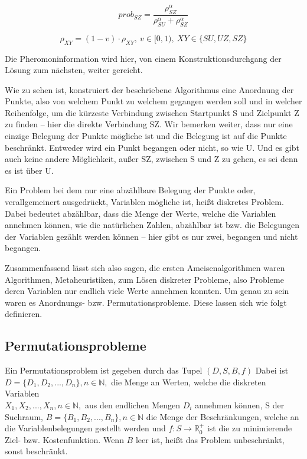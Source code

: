 \documentclass[fontsize=12, a4aper]{scrartcl}
\begin{document}
	\begin{equation} \label{direkterWeg}
	prob_{SZ} = \frac{\rho_{SZ}^\alpha}{\rho_{SU}^\alpha+\rho_{SZ}^\alpha}
	\end{equation}
	
	\begin{equation} \label{Verdustung}
	\rho_{XY} = (1-v)\cdot\rho_{XY}, ~ v \in [0,1), ~ XY \in \{SU, UZ, SZ\}
	\end{equation}
	
	Die Pheromoninformation wird hier, von einem Konstruktionsdurchgang der Lösung zum nächsten, weiter gereicht.\hfill\newline
	
	Wie zu sehen ist, konstruiert der beschriebene Algorithmus eine Anordnung der Punkte, also von welchem Punkt zu welchem gegangen werden soll und in welcher Reihenfolge, um die kürzeste Verbindung zwischen Startpunkt S und Zielpunkt Z zu finden -- hier die direkte Verbindung SZ. Wir bemerken weiter, dass nur eine einzige Belegung der Punkte mögliche ist und die Belegung ist auf die Punkte beschränkt. Entweder wird ein Punkt begangen oder nicht, so wie U. Und es gibt auch keine andere Möglichkeit, außer SZ, zwischen S und Z zu gehen, es sei denn es ist über U.\hfill\newline
	
	Ein Problem bei dem nur eine abzählbare Belegung der Punkte oder, verallgemeinert ausgedrückt, Variablen mögliche ist, heißt diskretes Problem. Dabei bedeutet abzählbar, dass die Menge der Werte, welche die Variablen annehmen können, wie die natürlichen Zahlen, abzählbar ist bzw. die Belegungen der Variablen gezählt werden können -- hier gibt es nur zwei, begangen und nicht begangen. \hfill\newline
	
	Zusammenfassend lässt sich also sagen, die ersten Ameisenalgorithmen waren Algorithmen, Metaheuristiken, zum Lösen diskreter Probleme, also Probleme deren Variablen nur endlich viele Werte annehmen konnten. Um genau zu sein waren es Anordnungs- bzw. Permutationsprobleme. Diese lassen sich wie folgt definieren.\hfill\newline
	
	\subsection{Permutationsprobleme}
	
	Ein Permutationsproblem ist gegeben durch das Tupel \((D, S, B, f)\) Dabei ist \(D=\{D_1, D_2, ..., D_n\}, n \in \mathbb{N},\) die Menge an Werten, welche die diskreten Variablen\\
	\(X_1, X_2, ..., X_n, n \in \mathbb{N},\) aus den endlichen Mengen \(D_i\) annehmen können, S der Suchraum, \(B=\{B_1, B_2, ..., B_n\}, n \in \mathbb{N}\) die Menge der Beschränkungen, welche an die Variablenbelegungen gestellt werden und \(f: S \to \mathbb{R}_0^+ \) ist die zu minimierende Ziel- bzw. Kostenfunktion. Wenn \(B\) leer ist, heißt das Problem unbeschränkt, sonst beschränkt.\hfill\newline
	
\end{document}
